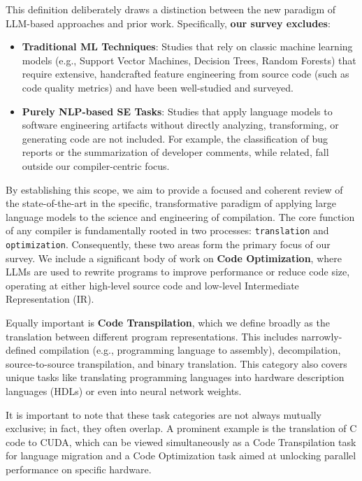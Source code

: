 \documentclass[pdflatex,sn-mathphys-ay,twocolumn, a4paper]{sn-jnl}%
\theoremstyle{thmstyleone}%
\theoremstyle{thmstyletwo}%
\theoremstyle{thmstylethree}%
\begin{document}
This definition deliberately draws a distinction between the new paradigm of LLM-based approaches and prior work. Specifically, \textbf{our survey excludes}:
\begin{itemize}
    \item \textbf{Traditional ML Techniques}: Studies that rely on classic machine learning models (e.g., Support Vector Machines, Decision Trees, Random Forests) that require extensive, handcrafted feature engineering from source code (such as code quality metrics) and have been well-studied and surveyed. 
    \item \textbf{Purely NLP-based SE Tasks}: Studies that apply language models to software engineering artifacts without directly analyzing, transforming, or generating code are not included. For example, the classification of bug reports or the summarization of developer comments, while related, fall outside our compiler-centric focus.
\end{itemize}

By establishing this scope, we aim to provide a focused and coherent review of the state-of-the-art in the specific, transformative paradigm of applying large language models to the science and engineering of compilation. 
The core function of any compiler is fundamentally rooted in two processes: \texttt{translation} and \texttt{optimization}. Consequently, these two areas form the primary focus of our survey. We include a significant body of work on \textbf{Code Optimization}, where LLMs are used to rewrite programs to improve performance or reduce code size, operating at either high-level source code and low-level Intermediate Representation (IR). 

Equally important is \textbf{Code Transpilation}, which we define broadly as the translation between different program representations. This includes narrowly-defined compilation (e.g., programming language to assembly), decompilation, source-to-source transpilation, and binary translation. This category also covers unique tasks like translating programming languages into hardware description languages (HDLs) or even into neural network weights.

It is important to note that these task categories are not always mutually exclusive; in fact, they often overlap. A prominent example is the translation of C code to CUDA, which can be viewed simultaneously as a Code Transpilation task for language migration and a Code Optimization task aimed at unlocking parallel performance on specific hardware.
\end{document}
